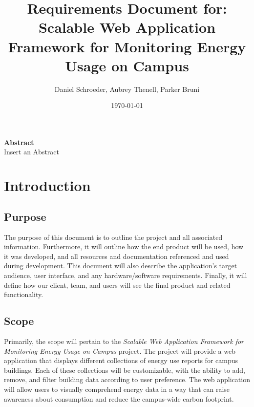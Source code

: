 \documentclass[onecolumn, draftclsnofoot,10pt, compsoc]{IEEEtran}
\title{Requirements Document for: \linebreak Scalable Web Application Framework for Monitoring Energy Usage on Campus}
\author{Daniel Schroeder, Aubrey Thenell, Parker Bruni}
\date{\today}
\begin{document}
    \maketitle
    \noindent \textbf{Abstract} \\
                \indent 
                Insert an Abstract
    
    
    \newpage
    \tableofcontents
    \clearpage
    
    \section{Introduction}
    \subsection{Purpose}
	The purpose of this document is to outline the project and all associated information. Furthermore, it will outline how the end product will be used, how it was developed, and all resources and documentation referenced and used during development. This document will also describe the application’s target audience, user interface, and any hardware/software requirements. Finally, it will define how our client, team, and users will see the final product and related functionality.
    \subsection{Scope}
    Primarily, the scope will pertain to the \textit{Scalable Web Application Framework for Monitoring Energy Usage on Campus}  project. The project will provide a web application that displays different collections of energy use reports for campus buildings. Each of these collections will be customizable, with the ability to add, remove, and filter building data according to user preference. The web application will allow users to visually comprehend energy data in a way that can raise awareness about consumption and reduce the campus-wide carbon footprint.
    
\end{document}
